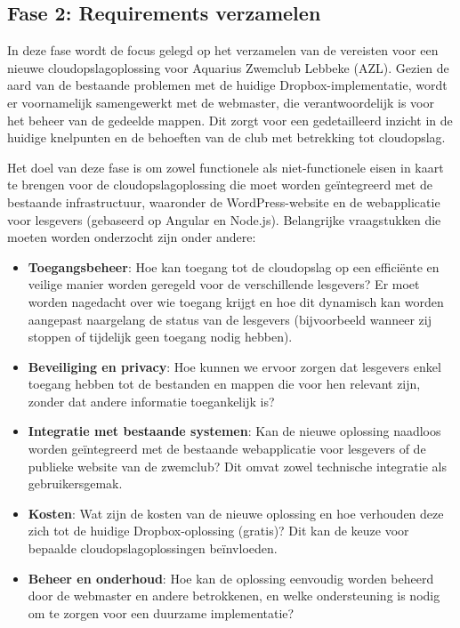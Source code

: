 \subsection{Fase 2: Requirements verzamelen}
In deze fase wordt de focus gelegd op het verzamelen van de vereisten voor een nieuwe cloudopslagoplossing voor Aquarius Zwemclub Lebbeke (AZL). Gezien de aard van de bestaande problemen met de huidige Dropbox-implementatie, wordt er voornamelijk samengewerkt met de webmaster, die verantwoordelijk is voor het beheer van de gedeelde mappen. Dit zorgt voor een gedetailleerd inzicht in de huidige knelpunten en de behoeften van de club met betrekking tot cloudopslag.

Het doel van deze fase is om zowel functionele als niet-functionele eisen in kaart te brengen voor de cloudopslagoplossing die moet worden geïntegreerd met de bestaande infrastructuur, waaronder de WordPress-website en de webapplicatie voor lesgevers (gebaseerd op Angular en Node.js). Belangrijke vraagstukken die moeten worden onderzocht zijn onder andere:
\begin{itemize}
    \item \textbf{Toegangsbeheer}: Hoe kan toegang tot de cloudopslag op een efficiënte en veilige manier worden geregeld voor de verschillende lesgevers? Er moet worden nagedacht over wie toegang krijgt en hoe dit dynamisch kan worden aangepast naargelang de status van de lesgevers (bijvoorbeeld wanneer zij stoppen of tijdelijk geen toegang nodig hebben).
    \item \textbf{Beveiliging en privacy}: Hoe kunnen we ervoor zorgen dat lesgevers enkel toegang hebben tot de bestanden en mappen die voor hen relevant zijn, zonder dat andere informatie toegankelijk is?
    \item \textbf{Integratie met bestaande systemen}: Kan de nieuwe oplossing naadloos worden geïntegreerd met de bestaande webapplicatie voor lesgevers of de publieke website van de zwemclub? Dit omvat zowel technische integratie als gebruikersgemak.
    \item \textbf{Kosten}: Wat zijn de kosten van de nieuwe oplossing en hoe verhouden deze zich tot de huidige Dropbox-oplossing (gratis)? Dit kan de keuze voor bepaalde cloudopslagoplossingen beïnvloeden.
    \item \textbf{Beheer en onderhoud}: Hoe kan de oplossing eenvoudig worden beheerd door de webmaster en andere betrokkenen, en welke ondersteuning is nodig om te zorgen voor een duurzame implementatie?
\end{itemize}

